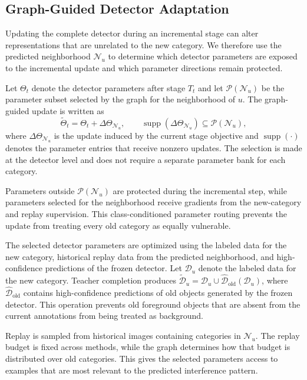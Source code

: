 \subsection{Graph-Guided Detector Adaptation}
\label{sec:graph_guided_detector_adaptation}

Updating the complete detector during an incremental stage can alter
representations that are unrelated to the new category. We therefore use the
predicted neighborhood $\mathcal{N}_u$ to determine which detector parameters
are exposed to the incremental update and which parameter directions remain
protected.

Let $\Theta_t$ denote the detector parameters after stage $T_t$ and let
$\mathcal{P}(\mathcal{N}_u)$ be the parameter subset selected by the graph for
the neighborhood of $u$. The graph-guided update is written as
\begin{equation}
\widetilde{\Theta}_t=\Theta_t+\Delta\Theta_{\mathcal{N}_u},
\qquad
\operatorname{supp}(\Delta\Theta_{\mathcal{N}_u})
\subseteq\mathcal{P}(\mathcal{N}_u),
\label{eq:graph_guided_update}
\end{equation}
where $\Delta\Theta_{\mathcal{N}_u}$ is the update induced by the current
stage objective and $\operatorname{supp}(\cdot)$ denotes the parameter entries
that receive nonzero updates. The selection is made at the detector level and
does not require a separate parameter bank for each category.

Parameters outside $\mathcal{P}(\mathcal{N}_u)$ are protected during the
incremental step, while parameters selected for the neighborhood receive
gradients from the new-category and replay supervision. This class-conditioned
parameter routing prevents the update from treating every old category as
equally vulnerable.

The selected detector parameters are optimized using the labeled data for the
new category, historical replay data from the predicted neighborhood, and
high-confidence predictions of the frozen detector. Let $\mathcal{D}_u$ denote
the labeled data for the new category. Teacher completion produces
$\widetilde{\mathcal{D}}_u
=\mathcal{D}_u\cup\widehat{\mathcal{D}}_{\mathrm{old}}(\mathcal{D}_u)$,
where $\widehat{\mathcal{D}}_{\mathrm{old}}$ contains high-confidence
predictions of old objects generated by the frozen detector. This operation
prevents old foreground objects that are absent from the current annotations
from being treated as background.

Replay is sampled from historical images containing categories in
$\mathcal{N}_u$. The replay budget is fixed across methods, while the graph
determines how that budget is distributed over old categories. This gives the
selected parameters access to examples that are most relevant to the predicted
interference pattern.

